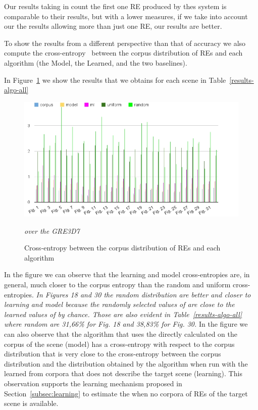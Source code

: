 Our results taking in count the first one RE produced by thes system is comparable to their results, but with a lower measures, if we take into account our the results allowing more than just one RE, our results are better.

To show the results from a different perspective than that of accuracy we also compute the cross-entropy~\cite{juraksky:spee08} between the corpus distribution of REs and each algorithm (the Model, the Learned, and the two baselines).    


In Figure~\ref{Entropy} we show the results that we obtains for each scene in Table~\ref{results-algo-all} 

\begin{figure}[h!]
\begin{center}
\includegraphics[width=.9\textwidth]{images/entropyComplete.jpg}
\end{center}
\vspace*{-2em}
\caption{Cross-entropy between the corpus distribution of REs and each algorithm} \textit{over the GRE3D7}\label{Entropy}
\end{figure}

In the figure we can observe that the learning and model cross-entropies are, in general, much closer to the corpus entropy than the random and uniform cross-entropies. \textit{In Figures 18 and 30 the random distribution are better and closer to learning and model because the randomly selected values of \puse are close to the learned values of \puse by chance. Those are also evident in Table~\ref{results-algo-all} where random are 31,66\% for Fig. 18 and 38,83\% for Fig. 30.}
In the figure we can also observe that the algorithm that uses the \puse directly calculated on the corpus of the scene (model) has a cross-entropy with respect to the corpus distribution that is very close to the cross-entropy between the corpus distribution and the distribution obtained by the algorithm when run with the \puse learned from corpora that does not describe the target scene (learning). This observation supports the learning mechanism proposed in Section~\ref{subsec:learning} to estimate the \puse when no corpora of REs of the target scene is available. 
